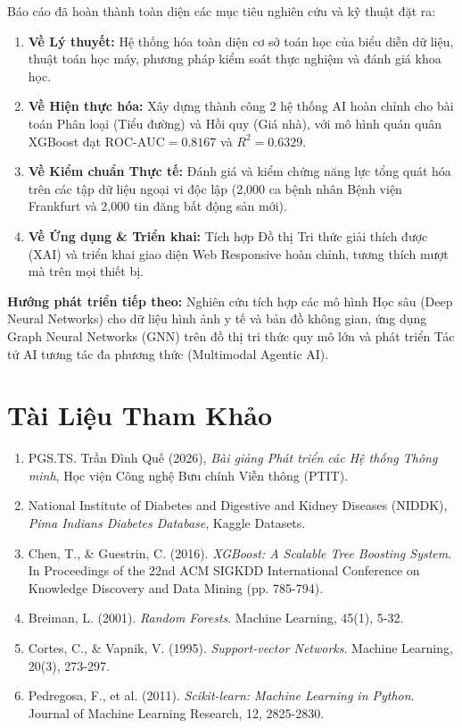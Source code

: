 \documentclass[12pt,a4paper]{report}
\begin{document}
Báo cáo đã hoàn thành toàn diện các mục tiêu nghiên cứu và kỹ thuật đặt ra:
\begin{enumerate}[leftmargin=1.5em]
    \item \textbf{Về Lý thuyết:} Hệ thống hóa toàn diện cơ sở toán học của biểu diễn dữ liệu, thuật toán học máy, phương pháp kiểm soát thực nghiệm và đánh giá khoa học.
    \item \textbf{Về Hiện thực hóa:} Xây dựng thành công 2 hệ thống AI hoàn chỉnh cho bài toán Phân loại (Tiểu đường) và Hồi quy (Giá nhà), với mô hình quán quân XGBoost đạt $\text{ROC-AUC} = 0.8167$ và $R^2 = 0.6329$.
    \item \textbf{Về Kiểm chuẩn Thực tế:} Đánh giá và kiểm chứng năng lực tổng quát hóa trên các tập dữ liệu ngoại vi độc lập (2,000 ca bệnh nhân Bệnh viện Frankfurt và 2,000 tin đăng bất động sản mới).
    \item \textbf{Về Ứng dụng \& Triển khai:} Tích hợp Đồ thị Tri thức giải thích được (XAI) và triển khai giao diện Web Responsive hoàn chỉnh, tương thích mượt mà trên mọi thiết bị.
\end{enumerate}

\textbf{Hướng phát triển tiếp theo:}
Nghiên cứu tích hợp các mô hình Học sâu (Deep Neural Networks) cho dữ liệu hình ảnh y tế và bản đồ không gian, ứng dụng Graph Neural Networks (GNN) trên đồ thị tri thức quy mô lớn và phát triển Tác tử AI tương tác đa phương thức (Multimodal Agentic AI).

\chapter*{Tài Liệu Tham Khảo}

\begin{enumerate}[leftmargin=2em]
    \item PGS.TS. Trần Đình Quế (2026), \textit{Bài giảng Phát triển các Hệ thống Thông minh}, Học viện Công nghệ Bưu chính Viễn thông (PTIT).
    \item National Institute of Diabetes and Digestive and Kidney Diseases (NIDDK), \textit{Pima Indians Diabetes Database}, Kaggle Datasets.
    \item Chen, T., \& Guestrin, C. (2016). \textit{XGBoost: A Scalable Tree Boosting System}. In Proceedings of the 22nd ACM SIGKDD International Conference on Knowledge Discovery and Data Mining (pp. 785-794).
    \item Breiman, L. (2001). \textit{Random Forests}. Machine Learning, 45(1), 5-32.
    \item Cortes, C., \& Vapnik, V. (1995). \textit{Support-vector Networks}. Machine Learning, 20(3), 273-297.
    \item Pedregosa, F., et al. (2011). \textit{Scikit-learn: Machine Learning in Python}. Journal of Machine Learning Research, 12, 2825-2830.
\end{enumerate}
\end{document}
